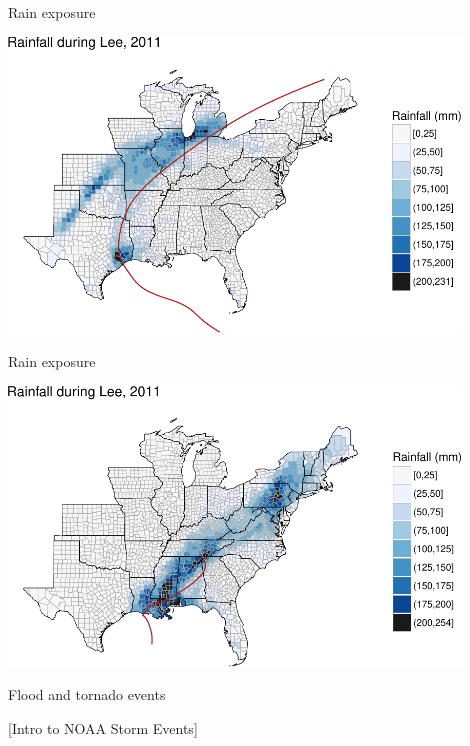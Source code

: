 \documentclass[ignorenonframetext,]{beamer}
\begin{document}
\begin{frame}{Rain exposure}

\begin{center}\includegraphics[width=0.9\textwidth]{anderson_jan11_files/figure-beamer/ike_rain_example-1} \end{center}

\end{frame}

\begin{frame}{Rain exposure}

\begin{center}\includegraphics[width=0.9\textwidth]{anderson_jan11_files/figure-beamer/lee_rain_example-1} \end{center}

\end{frame}

\begin{frame}{Flood and tornado events}

{[}Intro to NOAA Storm Events{]}

\end{frame}
\end{document}
